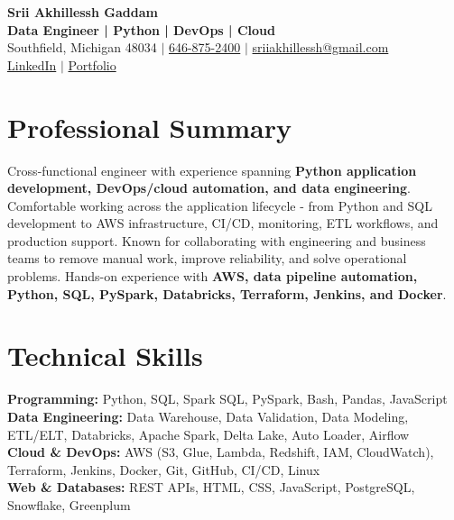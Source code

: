\documentclass[letterpaper,10pt]{article}
\begin{document}
\fontsize{9.35pt}{10.45pt}\selectfont

\begin{center}
    {\LARGE \textbf{Srii Akhillessh Gaddam}} \\[-1pt]
    \textbf{Data Engineer | Python | DevOps | Cloud} \\[2pt]
    Southfield, Michigan 48034 $|$
    \href{tel:6468752400}{646-875-2400} $|$
    \href{mailto:sriiakhillessh@gmail.com}{sriiakhillessh@gmail.com} \\[1pt]
    \href{https://www.linkedin.com/in/srii-akhiilessh-gaddam-b48668191/}{LinkedIn} $|$
    \href{https://sriiakhillesshg.github.io/portfolio/}{Portfolio}
\end{center}
\vspace{-8pt}

\section{Professional Summary}
\small{Cross-functional engineer with experience spanning \textbf{Python application development, DevOps/cloud automation, and data engineering}. Comfortable working across the application lifecycle - from Python and SQL development to AWS infrastructure, CI/CD, monitoring, ETL workflows, and production support. Known for collaborating with engineering and business teams to remove manual work, improve reliability, and solve operational problems. Hands-on experience with \textbf{AWS, data pipeline automation, Python, SQL, PySpark, Databricks, Terraform, Jenkins, and Docker}.}

\section{Technical Skills}
\small{
\textbf{Programming:} Python, SQL, Spark SQL, PySpark, Bash, Pandas, JavaScript \\
\textbf{Data Engineering:} Data Warehouse, Data Validation, Data Modeling, ETL/ELT, Databricks, Apache Spark, Delta Lake, Auto Loader, Airflow \\
\textbf{Cloud \& DevOps:} AWS (S3, Glue, Lambda, Redshift, IAM, CloudWatch), Terraform, Jenkins, Docker, Git, GitHub, CI/CD, Linux \\
\textbf{Web \& Databases:} REST APIs, HTML, CSS, JavaScript, PostgreSQL, Snowflake, Greenplum
}
\end{document}

